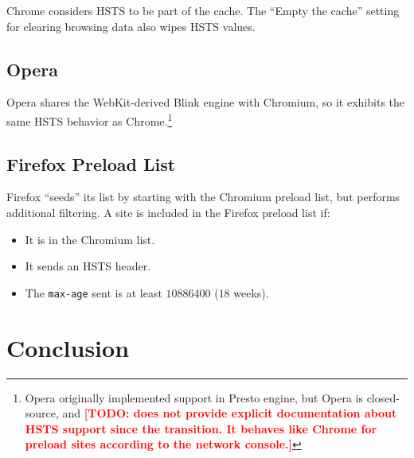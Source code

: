 \documentclass[conference]{./IEEEtran}
\newcommand{\todo}[1]{\textcolor{red}{\textbf{[TODO: #1]}}}
\newcommand{\code}[1]{\texttt{#1}}
\theoremstyle{plain}
\begin{document}
Chrome considers HSTS to be part of the cache. The ``Empty the cache'' setting for clearing browsing data also wipes HSTS values.

\subsection{Opera}

Opera shares the WebKit-derived Blink engine with Chromium, so it exhibits the same HSTS behavior as Chrome.\footnote{Opera originally implemented support in Presto engine\cite{opera}, but Opera is closed-source, and \todo{does not provide explicit documentation about HSTS support since the transition. It behaves like Chrome for preload sites according to the network console.}}

\subsection{Firefox Preload List}

Firefox ``seeds'' its list by starting with the Chromium preload list, but performs additional filtering. A site is included in the Firefox preload list if:

\begin{itemize}
\item It is in the Chromium list.
\item It sends an HSTS header.
\item The \code{max-age} sent is at least $10886400$ ($18$ weeks).
\end{itemize}

\section{Conclusion}



\end{document}
